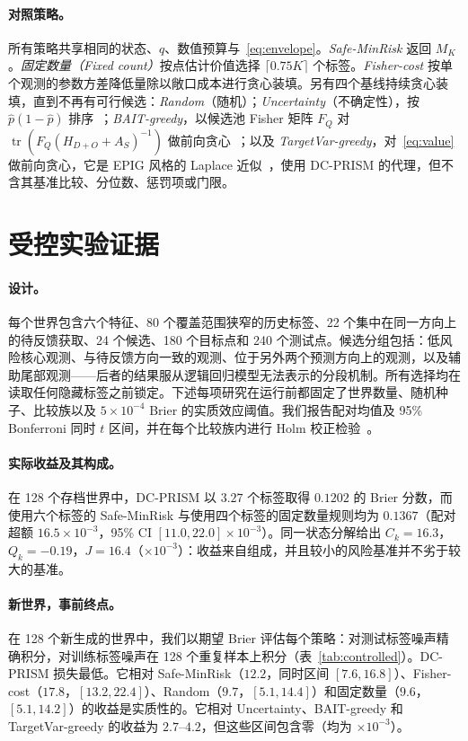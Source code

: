 \documentclass[runningheads]{llncs}
\begin{document}
\paragraph{对照策略。}所有策略共享相同的状态、$q$、数值预算与~\eqref{eq:envelope}。\emph{Safe-MinRisk} 返回 $M_K$。\emph{固定数量（Fixed count）}按点估计价值选择 $\lceil0.75K\rceil$ 个标签。\emph{Fisher-cost} 按单个观测的参数方差降低量除以敞口成本进行贪心装填。另有四个基线持续贪心装填，直到不再有可行候选：\emph{Random}（随机）；\emph{Uncertainty}（不确定性），按 $\widehat p(1-\widehat p)$ 排序~\cite{lewis1994sequential}；\emph{BAIT-greedy}，以候选池 Fisher 矩阵 $F_Q$ 对 $\operatorname{tr}(F_Q(H_{D+O}+A_S)^{-1})$ 做前向贪心~\cite{ash2021fishing}；以及 \emph{TargetVar-greedy}，对~\eqref{eq:value} 做前向贪心，它是 EPIG 风格的 Laplace 近似~\cite{bickfordsmith2023prediction}，使用 DC-PRISM 的代理，但不含其基准比较、分位数、惩罚项或门限。

\section{受控实验证据}
\label{sec:controlled}
\paragraph{设计。}每个世界包含六个特征、80 个覆盖范围狭窄的历史标签、22 个集中在同一方向上的待反馈获取、24 个候选、180 个目标点和 240 个测试点。候选分组包括：低风险核心观测、与待反馈方向一致的观测、位于另外两个预测方向上的观测，以及辅助尾部观测——后者的结果服从逻辑回归模型无法表示的分段机制。所有选择均在读取任何隐藏标签之前锁定。下述每项研究在运行前都固定了世界数量、随机种子、比较族以及 $5\times10^{-4}$ Brier 的实质效应阈值。我们报告配对均值及 95\% Bonferroni 同时 $t$ 区间，并在每个比较族内进行 Holm 校正检验~\cite{holm1979simple}。

\paragraph{实际收益及其构成。}在 128 个存档世界中，DC-PRISM 以 $3.27$ 个标签取得 $0.1202$ 的 Brier 分数，而使用六个标签的 Safe-MinRisk 与使用四个标签的固定数量规则均为 $0.1367$（配对超额 $16.5\times10^{-3}$，95\% CI $[11.0,22.0]\times10^{-3}$）。同一状态分解给出 $C_k=16.3$，$Q_k=-0.19$，$J=16.4$（$\times10^{-3}$）：收益来自组成，并且较小的风险基准并不劣于较大的基准。

\paragraph{新世界，事前终点。}在 128 个新生成的世界中，我们以期望 Brier 评估每个策略：对测试标签噪声精确积分，对训练标签噪声在 128 个重复样本上积分（表~\ref{tab:controlled}）。DC-PRISM 损失最低。它相对 Safe-MinRisk（$12.2$，同时区间 $[7.6,16.8]$）、Fisher-cost（$17.8$，$[13.2,22.4]$）、Random（$9.7$，$[5.1,14.4]$）和固定数量（$9.6$，$[5.1,14.2]$）的收益是实质性的。它相对 Uncertainty、BAIT-greedy 和 TargetVar-greedy 的收益为 $2.7$--$4.2$，但这些区间包含零（均为 $\times10^{-3}$）。
\end{document}
